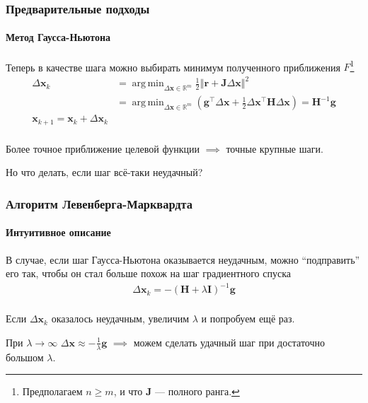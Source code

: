 \documentclass[notheorems,aspectratio=169]{beamer}
\DeclareMathOperator*{\argmin}{arg\,min}
\begin{document}
\begin{frame}
  \frametitle{Предварительные подходы}
  \framesubtitle{Метод Гаусса-Ньютона}
  Теперь в качестве шага можно выбирать минимум полученного приближения $F$\footnote[frame]{Предполагаем $n\geq m$, и что $\mathbf{J}$ --- полного ранга.}
  \begin{align*}
    \Delta\mathbf{x}_k & =\argmin_{\Delta\mathbf{x}\in \mathbb{R}^m}\frac{1}{2}\left\Vert\mathbf{r}+\mathbf{J}\Delta\mathbf{x}\right\Vert^2 \\
                       & =\argmin_{\Delta\mathbf{x}\in \mathbb{R}^m}\left(\mathbf{g}^\intercal\Delta\mathbf{x}+\frac{1}{2}\Delta\mathbf{x}^\intercal\mathbf{H}\Delta\mathbf{x}\right)=\mathbf{H}^{-1}\mathbf{g} \\
      \mathbf{x}_{k+1}=\mathbf{x}_k+\Delta\mathbf{x}_k \\
  \end{align*}

    Более точное приближение целевой функции $\implies$ точные крупные шаги.

    Но что делать, если шаг всё-таки неудачный?
\end{frame}

\begin{frame}
  \frametitle{Алгоритм Левенберга-Марквардта}
  \framesubtitle{Интуитивное описание}
  В случае, если шаг Гаусса-Ньютона оказывается неудачным, можно ``подправить'' его так, чтобы он стал больше похож на шаг градиентного спуска
  \begin{equation*}
    \begin{gathered}
      \Delta\mathbf{x}_k=-\left(\mathbf{H}+\lambda\mathbf{I}\right)^{-1}\mathbf{g} \\
    \end{gathered}
  \end{equation*}

  Если $\Delta\mathbf{x}_k$ оказалось неудачным, увеличим $\lambda$ и попробуем ещё раз.
  
  При $\lambda\rightarrow\infty$ $\Delta\mathbf{x}\approx -\frac{1}{\lambda}\mathbf{g}$ $\implies$ можем сделать удачный шаг при достаточно большом $\lambda$.

\end{frame}
\end{document}
